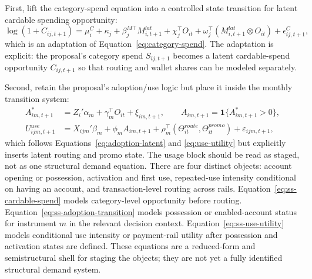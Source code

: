 \documentclass[11pt]{article}
\newcommand{\1}{\mathbf{1}}
\begin{document}
First, lift the category-spend equation into a controlled state transition for
latent cardable spending opportunity:
\begin{equation}
  \log(1+C_{ij,t+1})
  =
  \mu_i^{C} + \kappa_j + \beta_j^{M\top}M^{lat}_{i,t+1}
  + \chi_j^{\top}O_{it}
  + \omega_j^{\top}(M^{lat}_{i,t+1}\otimes O_{it})
  + \epsilon^C_{ij,t+1},
  \label{eq:ss-cardable-spend}
\end{equation}
which is an adaptation of Equation~\eqref{eq:category-spend}. The adaptation is
explicit: the proposal's category spend $S_{ij,t+1}$ becomes a latent
cardable-spend opportunity $C_{ij,t+1}$ so that routing and wallet shares can be
modeled separately.

Second, retain the proposal's adoption/use logic but place it inside the
monthly transition system:
\begin{align}
  A^*_{im,t+1}
    &= Z_i'\alpha_m + \gamma_m^{\top}O_{it} + \xi_{im,t+1},
       \qquad A_{im,t+1}=\1\{A^*_{im,t+1}>0\},
       \label{eq:ss-adoption-transition}\\
  U^{use}_{ijm,t+1}
    &= X_{ijm}'\beta_m + \phi_m A_{im,t+1}
       + \rho_m^{\top}(\Theta^{route}_{it},\Theta^{promo}_{it})
       + \varepsilon_{ijm,t+1},
       \label{eq:ss-use-utility}
\end{align}
which follows Equations~\eqref{eq:adoption-latent} and
\eqref{eq:use-utility} but explicitly inserts latent routing and promo state.
The usage block should be read as staged, not as one structural demand equation.
There are four distinct objects: account opening or possession, activation and
first use, repeated-use intensity conditional on having an account, and
transaction-level routing across rails. Equation~\eqref{eq:ss-cardable-spend}
models category-level opportunity before routing.
Equation~\eqref{eq:ss-adoption-transition} models possession or enabled-account
status for instrument $m$ in the relevant decision context.
Equation~\eqref{eq:ss-use-utility} models conditional use intensity or
payment-rail utility after possession and activation states are defined. These
equations are a reduced-form and semistructural shell for staging the objects;
they are not yet a fully identified structural demand system.
\end{document}
